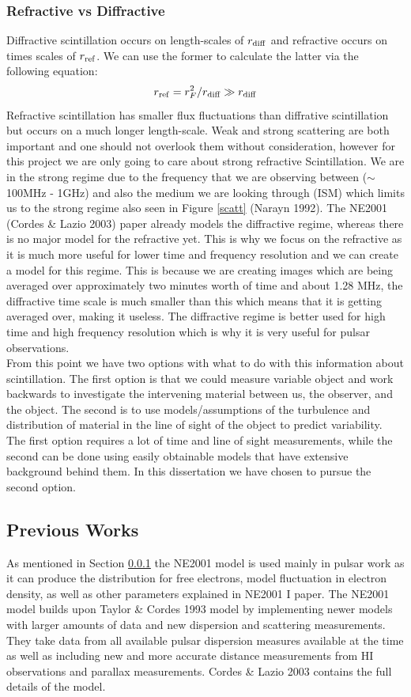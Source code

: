 \documentclass[a4paper, 10pt]{article}
\begin{document}
\subsubsection{Refractive vs Diffractive} \label{RvD}
Diffractive scintillation occurs on length-scales of $r_{\ce{diff}}$ and refractive occurs on times scales of $r_{\ce{ref}}$. We can use the former to calculate the latter via the following equation:
\[ r_{\ce{ref}} = r_{F}^{2}/r_{\ce{diff}}\gg r_{\ce{diff}} \]
Refractive scintillation has smaller flux fluctuations than diffrative scintillation but occurs on a much longer length-scale. Weak and strong scattering are both important and one should not overlook them without consideration, however for this project we are only going to care about strong refractive Scintillation. We are in the strong regime due to the frequency that we are observing between ($\sim$100MHz - 1GHz) and also the medium we are looking through (ISM) which limits us to the strong regime also seen in Figure \ref{scatt} (Narayn 1992). The NE2001 (Cordes \& Lazio 2003) paper already models the diffractive regime, whereas there is no major model for the refractive yet. This is why we focus on the refractive as it is much more useful for lower time and frequency resolution and we can create a model for this regime. This is because we are creating images which are being averaged over approximately two minutes worth of time and about 1.28 MHz, the diffractive time scale is much smaller than this which means that it is getting averaged over, making it useless. The diffractive regime is better used for high time and high frequency resolution which is why it is very useful for pulsar observations.\\

From this point we have two options with what to do with this information about scintillation. The first option is that we could measure variable object and work backwards to investigate the intervening material between us, the observer, and the object. The second is to use models/assumptions of the turbulence and distribution of material in the line of sight of the object to predict variability. The first option requires a lot of time and line of sight measurements, while the second can be done using easily obtainable models that have extensive background behind them. In this dissertation we have chosen to pursue the second option. 
\subsection{Previous Works}
As mentioned in Section \ref{RvD} the NE2001 model is used mainly in pulsar work as it can produce the distribution for free electrons, model fluctuation in electron density, as well as other parameters explained in NE2001 I paper. The NE2001 model builds upon Taylor \& Cordes 1993 \citet{Taylor} model by implementing newer models with larger amounts of data and new dispersion and scattering measurements. They take data from all available pulsar dispersion measures available at the time as well as including new and more accurate distance measurements from HI observations and parallax measurements. Cordes \& Lazio 2003 \citet{Cordes} contains the full details of the model.\\
\end{document}
